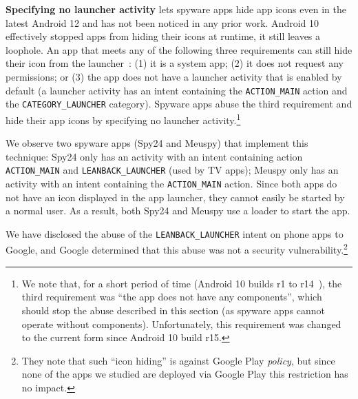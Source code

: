 
\textbf{Specifying no launcher activity} lets spyware apps hide app
icons even in the latest Android 12 and has not been noticed in any prior work.
Android 10 effectively stopped apps from hiding their icons at
runtime, it still leaves a loophole. An app that meets any of the
following three requirements can still hide their icon from the
launcher~\cite{Launcher79:online}: (1) it is a system app; (2) it does
not request any permissions; or (3) the app does not have a launcher
activity that is enabled by default (a launcher activity has an intent
containing the \texttt{ACTION\_MAIN} action and the
\texttt{CATEGORY\_LAUNCHER} category). Spyware apps abuse the third
requirement and hide their app icons by specifying no launcher
activity.\footnote{We note that, for a short period of time (Android 10 builds r1 to r14~\cite{Launcher48:online}), the third requirement was ``the app does not have any components'', which should stop the abuse described in this section (as spyware apps cannot operate without components). Unfortunately, this requirement was changed to the current form since Android 10 build r15.\label{footnote:hide_icon}}

We observe two spyware apps (Spy24 and Meuspy) that implement this
technique: Spy24 only has an activity with an intent containing action
\texttt{ACTION\_MAIN} and \texttt{LEANBACK\_LAUNCHER} (used by TV
apps); Meuspy only has an activity with an intent containing
the \texttt{ACTION\_MAIN} action.
Since both apps do not have an icon displayed in the app launcher,
they cannot easily be started by a normal user.  As a result, both
Spy24 and Meuspy use a loader to start the app.

We have disclosed the abuse of the \texttt{LEANBACK\_LAUNCHER} intent
on phone apps to Google, and Google determined that
this abuse was not a security vulnerability.\footnote{They note that such ``icon hiding'' is against Google Play \emph{policy}, but since none of the apps we studied are deployed via Google Play this restriction has no impact.}

